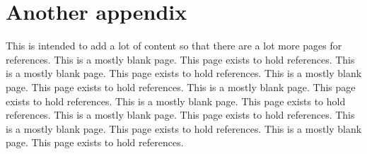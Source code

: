 \chapter{Another appendix}

This is intended to add a lot of content so that there are a lot more pages for references.\newpage
This is a mostly blank page.\newpage
This page exists to hold references.\newpage
This is a mostly blank page.\newpage
This page exists to hold references.\newpage
This is a mostly blank page.\newpage
This page exists to hold references.\newpage
This is a mostly blank page.\newpage
This page exists to hold references.\newpage
This is a mostly blank page.\newpage
This page exists to hold references.\newpage
This is a mostly blank page.\newpage
This page exists to hold references.\newpage
This is a mostly blank page.\newpage
This page exists to hold references.\newpage
This is a mostly blank page.\newpage
This page exists to hold references.\newpage
